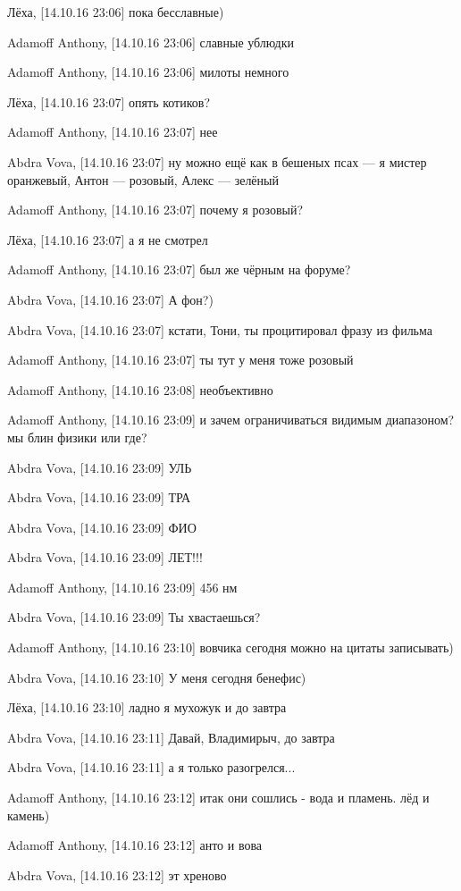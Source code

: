 Лёха, [14.10.16 23:06]
пока бесславные)

Adamoff Anthony, [14.10.16 23:06]
славные ублюдки

Adamoff Anthony, [14.10.16 23:06]
милоты немного

Лёха, [14.10.16 23:07]
опять котиков?

Adamoff Anthony, [14.10.16 23:07]
нее

Abdra Vova, [14.10.16 23:07]
ну можно ещё как в бешеных псах — я мистер оранжевый, Антон — розовый, Алекс — зелёный

Adamoff Anthony, [14.10.16 23:07]
почему я розовый?

Лёха, [14.10.16 23:07]
а я не смотрел

Adamoff Anthony, [14.10.16 23:07]
был же чёрным на форуме?

Abdra Vova, [14.10.16 23:07]
А фон?)

Abdra Vova, [14.10.16 23:07]
кстати, Тони, ты процитировал фразу из фильма

Adamoff Anthony, [14.10.16 23:07]
ты тут у меня тоже розовый

Adamoff Anthony, [14.10.16 23:08]
необъективно

Adamoff Anthony, [14.10.16 23:09]
и зачем ограничиваться видимым диапазоном? мы блин физики или где?

Abdra Vova, [14.10.16 23:09]
УЛЬ

Abdra Vova, [14.10.16 23:09]
ТРА

Abdra Vova, [14.10.16 23:09]
ФИО

Abdra Vova, [14.10.16 23:09]
ЛЕТ!!!

Adamoff Anthony, [14.10.16 23:09]
456 нм

Abdra Vova, [14.10.16 23:09]
Ты хвастаешься?

Adamoff Anthony, [14.10.16 23:10]
вовчика сегодня можно на цитаты записывать)

Abdra Vova, [14.10.16 23:10]
У меня сегодня бенефис)

Лёха, [14.10.16 23:10]
ладно я мухожук
и до завтра

Abdra Vova, [14.10.16 23:11]
Давай, Владимирыч, до завтра

Abdra Vova, [14.10.16 23:11]
а я только разогрелся...

Adamoff Anthony, [14.10.16 23:12]
итак они сошлись - вода и пламень. лёд и камень)

Adamoff Anthony, [14.10.16 23:12]
анто и вова

Abdra Vova, [14.10.16 23:12]
эт хреново


